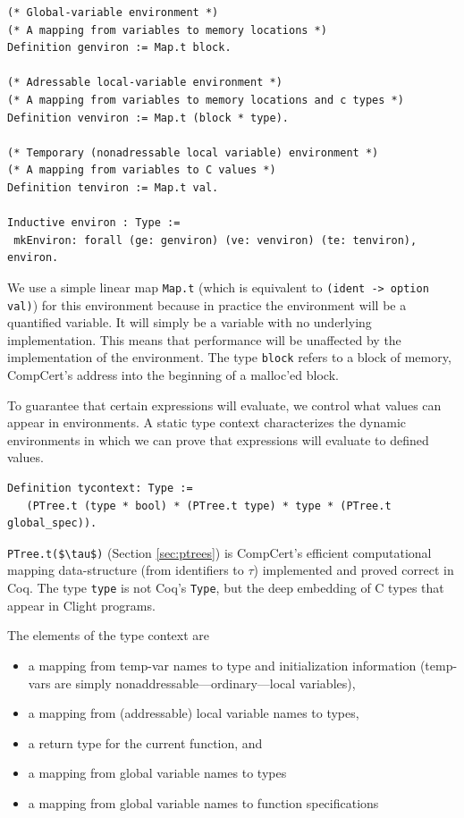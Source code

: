 \documentclass{puthesis}
\begin{document}
\begin{lstlisting}
(* Global-variable environment *)
(* A mapping from variables to memory locations *)
Definition genviron := Map.t block. 

(* Adressable local-variable environment *)
(* A mapping from variables to memory locations and c types *)
Definition venviron := Map.t (block * type).

(* Temporary (nonadressable local variable) environment *)
(* A mapping from variables to C values *)
Definition tenviron := Map.t val.

Inductive environ : Type :=
 mkEnviron: forall (ge: genviron) (ve: venviron) (te: tenviron), environ.
\end{lstlisting}

We use a simple linear map \lstinline|Map.t| (which is equivalent to
\lstinline|(ident -> option val)|) for this environment because in
practice the environment will be a quantified variable. It will simply
be a variable with no underlying implementation. This means that
performance will be unaffected by the implementation of the environment.
The type
\lstinline|block| refers to a block of memory, CompCert's address into the beginning of a
malloc'ed block.

To guarantee that certain expressions will evaluate, we control what
values can appear in environments. A static type context characterizes
the dynamic environments in which we can prove that expressions will
evaluate to defined values.

\begin{lstlisting}
Definition tycontext: Type :=
   (PTree.t (type * bool) * (PTree.t type) * type * (PTree.t global_spec)).
\end{lstlisting}
\lstinline|PTree.t($\tau$)| (Section \ref{sec:ptrees}) is CompCert's efficient computational mapping
data-structure (from identifiers to $\tau$) implemented and proved
correct in Coq. The type
\lstinline|type| is not Coq's \lstinline|Type|, but the deep embedding
of C types that appear in Clight programs.

The elements of the type context are
\begin{itemize}
  \item a mapping from temp-var names to type and initialization
  information (temp-vars are simply nonaddressable---ordinary---local variables),
  \item a mapping from (addressable) local variable names to types,
  \item a return type for the current function, and
  \item a mapping from global variable names to types
  \item a mapping from global variable names to function specifications
\end{itemize}
\end{document}

